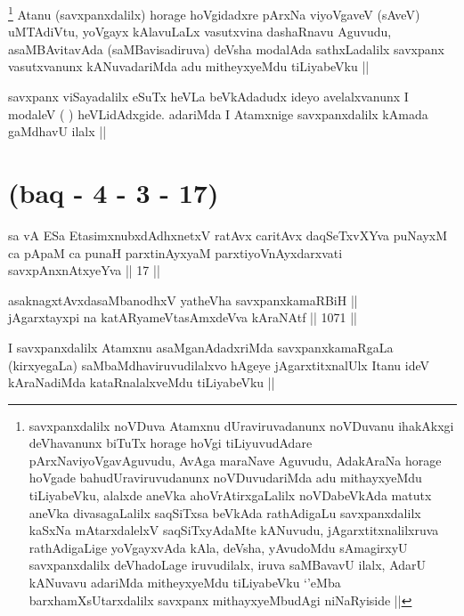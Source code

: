 \begin{artha}
\footnote{savxpanxdalilx noVDuva Atamxnu dUraviruvadanunx noVDuvanu ihakAkxgi deVhavanunx biTuTx horage hoVgi tiLiyuvudAdare pArxNaviyoVgavAguvudu, AvAga maraNave Aguvudu, AdakAraNa horage hoVgade bahudUraviruvudanunx noVDuvudariMda adu mithayxyeMdu tiLiyabeVku, alalxde aneVka ahoVrAtirxgaLalilx noVDabeVkAda matutx aneVka divasagaLalilx saqSiTxsa beVkAda rathAdigaLu savxpanxdalilx kaSxNa mAtarxdalelxV saqSiTxyAdaMte kANuvudu, jAgarxtitxnalilxruva rathAdigaLige yoVgayxvAda kAla, deVsha, yAvudoMdu sAmagirxyU savxpanxdalilx deVhadoLage iruvudilalx, iruva saMBavavU ilalx, AdarU kANuvavu adariMda mitheyxyeMdu tiLiyabeVku `\stext'eMba barxhamXsUtarxdalilx savxpanx mithayxyeMbudAgi niNaRyiside ||}
Atanu (savxpanxdalilx) horage hoVgidadxre pArxNa viyoVgaveV (sAveV) uMTAdiVtu, yoVgayx kAlavuLaLx vasutxvina dashaRnavu Aguvudu, asaMBAvitavAda (saMBavisadiruva) deVsha modalAda sathxLadalilx savxpanx vasutxvanunx kANuvadariMda adu mitheyxyeMdu tiLiyabeVku ||
\end{artha}

\begin{artha}
savxpanx viSayadalilx eSuTx heVLa beVkAdadudx ideyo avelalxvanunx I modaleV ( ) heVLidAdxgide. adariMda I Atamxnige savxpanxdalilx kAmada gaMdhavU ilalx ||
\end{artha}

\section*{(baq - 4 - 3 - 17)}
 
 \begin{shl}
sa vA ESa EtasimxnubxdAdhxnetxV ratAvx caritAvx daqSeTxvXYva puNayxM ca pApaM ca punaH parxtinAyxyaM parxtiyoVnAyxdarxvati savxpAnxnAtxyeYva || 17 ||
\end{shl}
 

\begin{shl}
asaknagxtAvxdasaMbanodhxV yatheVha savxpanxkamaRBiH || \\
jAgarxtayxpi na katAR\s yameVtasAmxdeVva kAraNAtf ||  1071 ||  
\end{shl}

\begin{artha}
I savxpanxdalilx Atamxnu asaMganAdadxriMda savxpanxkamaRgaLa (kirxyegaLa) saMbaMdhaviruvudilalxvo hAgeye jAgarxtitxnalUlx Itanu ideV kAraNadiMda kataRnalalxveMdu tiLiyabeVku ||
\end{artha}


